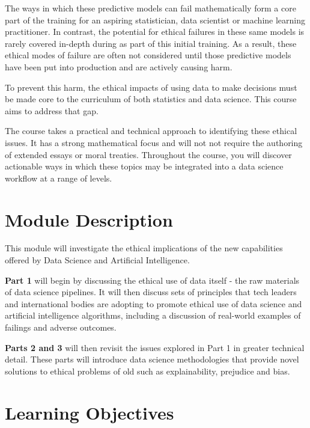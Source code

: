 \documentclass[
]{book}
\theoremstyle{definition}
\theoremstyle{definition}
\theoremstyle{definition}
\theoremstyle{definition}
\theoremstyle{remark}
\begin{document}
The ways in which these predictive models can fail mathematically form a
core part of the training for an aspiring statistician, data scientist
or machine learning practitioner. In contrast, the potential for ethical
failures in these same models is rarely covered in-depth during as part
of this initial training. As a result, these ethical modes of failure
are often not considered until those predictive models have been put
into production and are actively causing harm.

To prevent this harm, the ethical impacts of using data to make
decisions must be made core to the curriculum of both statistics and
data science. This course aims to address that gap.

The course takes a practical and technical approach to identifying these
ethical issues. It has a strong mathematical focus and will not not
require the authoring of extended essays or moral treaties. Throughout
the course, you will discover actionable ways in which these topics may
be integrated into a data science workflow at a range of levels.

\hypertarget{module-description}{%
\section{Module Description}\label{module-description}}

This module will investigate the ethical implications of the new
capabilities offered by Data Science and Artificial Intelligence.

\textbf{Part 1} will begin by discussing the ethical use of data itself - the
raw materials of data science pipelines. It will then discuss sets of
principles that tech leaders and international bodies are adopting to
promote ethical use of data science and artificial intelligence
algorithms, including a discussion of real-world examples of failings
and adverse outcomes.

\textbf{Parts 2 and 3} will then revisit the issues explored in Part 1 in
greater technical detail. These parts will introduce data science
methodologies that provide novel solutions to ethical problems of old
such as explainability, prejudice and bias.

\hypertarget{learning-objectives}{%
\section{Learning Objectives}\label{learning-objectives}}
\end{document}
